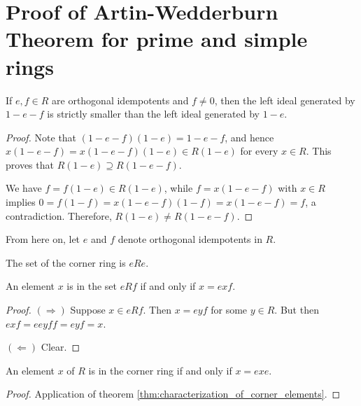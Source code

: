 \section{Proof of Artin-Wedderburn Theorem for prime and simple rings}
  \begin{theorem}
    \label{thm:one_sub_e_larger_span_on_sub_e_sub_f}
    If $e, f \in R$ are orthogonal idempotents and $f \neq 0$, then the left ideal generated by $1 - e - f$ is strictly smaller than the left ideal generated by $1 - e$.
  \end{theorem}
  \begin{proof}
    Note that $(1 - e - f)(1 - e) = 1 - e - f$, and hence
    $x(1 - e - f) = x(1 - e - f)(1 - e) \in R(1 - e)$
    for every $x \in R$. This proves that $R(1 - e) \supseteq R(1 - e - f)$.
    
    We have $f = f(1 - e) \in R(1 - e)$, while $f = x(1 - e - f)$ with $x \in R$ implies
    $0 = f(1 - f) = x(1 - e - f)(1 - f) = x(1 - e - f) = f$,
    a contradiction. Therefore, $R(1 - e) \neq R(1 - e - f)$.
  \end{proof}

  From here on, let $e$ and $f$ denote orthogonal idempotents in $R$.

  \begin{definition}
    \label{def:corner_ring}
    The set of the corner ring is $eRe$.
  \end{definition}

  \begin{theorem}
    \label{thm:characterization_of_corner_elements}
    An element $x$ is in the set $e R f$ if and only if $x = e x f$.
  \end{theorem}
  \begin{proof}
    $(\Rightarrow)$ Suppose $x \in e R f$. Then $x = e y f$ for some $y \in R$. But then $e x f = e e y f f = e y f = x$.

    $(\Leftarrow)$ Clear.
  \end{proof}
    

  \begin{theorem}
    \label{thm:characterization_of_corner_ring_elements}
    An element $x$ of $R$ is in the corner ring if and only if $x = e x e$.
  \end{theorem}
  \begin{proof}
    Application of theorem \ref{thm:characterization_of_corner_elements}.
  \end{proof}

